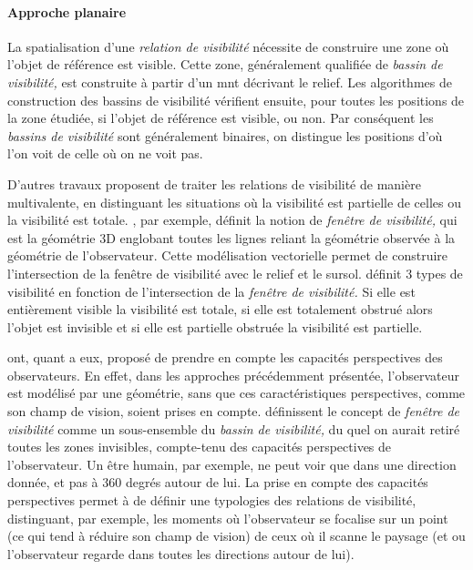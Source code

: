 
\paragraph{Approche planaire}


La spatialisation d'une \emph{relation de visibilité} nécessite de
construire une zone où l'objet de référence est visible. Cette zone,
généralement qualifiée de \emph{bassin de visibilité,} est construite
à partir d'un \ac{mnt} décrivant le relief. Les algorithmes de
construction des bassins de visibilité vérifient ensuite, pour toutes
les positions de la zone étudiée, si l'objet de référence est visible,
ou non. Par conséquent les \emph{bassins de visibilité} sont
généralement binaires, on distingue les positions d'où l'on voit de
celle où on ne voit pas.

D'autres travaux proposent de traiter les relations de visibilité de
manière multivalente, \ie en distinguant les situations où la
visibilité est partielle de celles ou la visibilité est
totale. \textcite{Ramos2003}, par exemple, définit la notion de
\emph{fenêtre de visibilité,} qui est la géométrie 3D englobant toutes
les lignes reliant la géométrie observée à la géométrie de
l'observateur. Cette modélisation vectorielle permet de construire
l'intersection de la fenêtre de visibilité avec le relief et le
sursol. \textcite{Ramos203} définit 3 types de visibilité en fonction
de l'intersection de la \emph{fenêtre de visibilité.} Si elle est
entièrement visible la visibilité est totale, si elle est totalement
obstrué alors l'objet est invisible et si elle est partielle obstruée
la visibilité est partielle.

\textcite{Lonergan2016} ont, quant a eux, proposé de prendre en compte
les capacités perspectives des observateurs. En effet, dans les
approches précédemment présentée, l'observateur est modélisé par une
géométrie, sans que ces caractéristiques perspectives, comme son champ
de vision, soient prises en compte. \textcite{Lonergan2016}
définissent le concept de \emph{fenêtre de visibilité} comme un
sous-ensemble du \emph{bassin de visibilité,} du quel on aurait retiré
toutes les zones invisibles, compte-tenu des capacités perspectives de
l'observateur. Un être humain, par exemple, ne peut voir que dans une
direction donnée, et pas à 360 degrés autour de lui. La prise en
compte des capacités perspectives permet à \textcite{Lonergan2016} de
définir une typologies des relations de visibilité, distinguant, par
exemple, les moments où l'observateur se focalise sur un point (ce qui
tend à réduire son champ de vision) de ceux où il scanne le paysage
(et ou l'observateur regarde dans toutes les directions autour de
lui).

